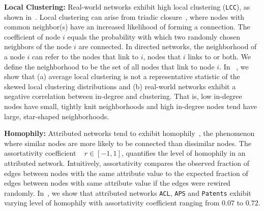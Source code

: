 \textbf{Local Clustering:}
Real-world networks exhibit high local clustering
(\texttt{LCC}), as shown in~. Local
clustering can arise from triadic closure~\cite{simmel1950sociology,
newman2001clustering}, where nodes with common neighbor(s) have an increased
likelihood of forming a connection.
The coefficient of node $i$ equals the probability with which two randomly chosen
neighbors of the node $i$ are connected. In directed networks, the neighborhood
of a node $i$ can refer to the nodes that link to $i$, nodes that
$i$ links to or both. We define the neighborhood to be the set
of all nodes that link to node $i$. In ~, we show that (a) average local clustering is not a
representative statistic of the skewed local clustering distributions and (b) real-world networks
exhibit a negative correlation between in-degree and clustering.
That is, low in-degree nodes have small, tightly knit neighborhoods
and high in-degree nodes tend have large, star-shaped neighborhoods.




\textbf{Homophily:}
Attributed networks tend to exhibit homophily~\cite{mcpherson2001birds}, the
phenomenon where similar nodes are more likely to be connected than dissimilar
nodes. The assortativity coefficient ~\cite{newman2002assortative} $r \in [-1,
1]$, quantifies the level of homophily in an attributed network.
Intuitively,
assortativity compares the observed fraction of edges between nodes with the same attribute
value to the expected fraction of edges between nodes with same attribute value
if the edges were rewired randomly. In~, we show that
attributed networks \texttt{ACL}, \texttt{APS} and \texttt{Patents} exhibit
varying level of homophily with assortativity coefficient ranging from $0.07$ to
$0.72$.

